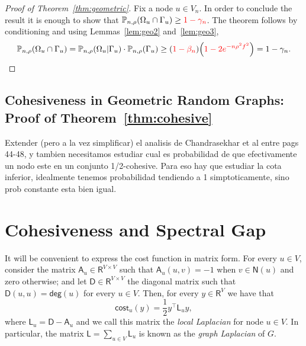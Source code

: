 \documentclass[letterpaper,11pt]{article}
\newcommand{\PP}{\mathbb{P}}
\newcommand{\RR}{\mathsf{R}}
\newcommand{\ZZ}{\mathbb{Z}}
\newcommand{\asf}{\mathsf{A}}
\newcommand{\dsf}{\mathsf{D}}
\newcommand{\lsf}{\mathsf{L}}
\newcommand{\nsf}{\mathsf{N}}
\newcommand{\cost}{\mathsf{cost}}
\newcommand{\degsf}{\mathsf{deg}}
\newcommand{\poi}{\mathsf{Geom}}
\begin{document}
\begin{proof}[Proof of Theorem~\ref{thm:geometric}]

Fix a node $u\in V_n$. 
In order to conclude the result it is enough to show that $\PP_{n,\rho}(\Omega_u\cap \Gamma_u)\ge {\color{red}1-\gamma_n}$.
The theorem follows by conditioning and using Lemmas~\ref{lem:geo2} and~\ref{lem:geo3},
\begin{equation*}
\PP_{n,\rho}(\Omega_u\cap \Gamma_u)=\PP_{n,\rho}(\Omega_u|\Gamma_u)\cdot \PP_{n,\rho}(\Gamma_u)\ge ({\color{red}1-\beta_n})\Big({\color{red}1-2e^{-n\rho^2f^2}}\Big)=1-\gamma_n.\qedhere
\end{equation*}
\end{proof}

\subsection{Cohesiveness in Geometric Random Graphs: Proof of Theorem~\ref{thm:cohesive}}
\label{sec:cohesive-thm}

{\color{blue} Extender (pero a la vez simplificar) el analisis de Chandrasekhar et al entre pags 44-48, y tambien necesitamos estudiar cual es probabilidad de que efectivamente un nodo este en un conjunto 1/2-cohesive. Para eso hay que estudiar la cota inferior, idealmente tenemos probabilidad tendiendo a 1 simptoticamente, sino prob constante esta bien igual.}

\section{Cohesiveness and Spectral Gap}
It will be convenient to express the cost function in matrix form.
For every $u\in V$, consider the matrix $\asf_u\in \RR^{V\times V}$ such that $\asf_u(u,v)=-1$ when $v\in \nsf(u)$ and zero otherwise; and let $\dsf\in \RR^{V\times V}$ the diagonal matrix such that $\dsf(u,u)=\degsf(u)$ for every $u\in V$.
Then, for every $y\in \RR^V$ we have that 
\begin{equation*}
\cost_u(y)=\frac{1}{2}y^{\top}\lsf_u y,
\end{equation*}
where $\lsf_u=\dsf-\asf_u$ and we call this matrix the {\it local Laplacian} for node $u\in V$.
In particular, the matrix $\lsf=\sum_{u\in V}\lsf_u$ is known as the {\it graph Laplacian} of $G$.\\
\end{document}

